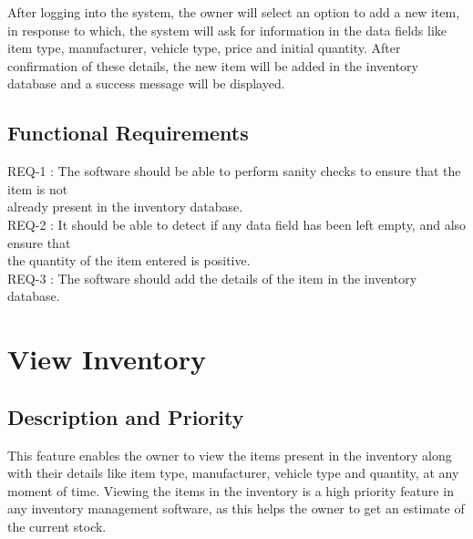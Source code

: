 \documentclass{scrreprt}
\begin{document}
After logging into the system, the owner will select an option to add a new item, in response to which, the system will ask for information in the data fields like item type, manufacturer, vehicle type, price and initial quantity. After confirmation of these details, the new item will be added in the inventory database and a success message will be displayed.

\subsection{Functional Requirements}


REQ-1 : The software should be able to perform sanity checks to ensure that the item is not\\ \hspace*{1.5cm} already present in the inventory database.\\
REQ-2 : It should be able to detect if any data field has been left empty, and also ensure that\\ \hspace*{1.5cm} the quantity of the item entered is positive.\\
REQ-3 : The software should add the details of the item in the inventory database.

\section{View Inventory}

\subsection{Description and Priority}

This feature enables the owner to view the items present in the inventory along with their details like item type, manufacturer, vehicle type and quantity, at any moment of time. Viewing the items in the inventory is a high priority feature in any inventory management software, as this helps the owner to get an estimate of the current stock.
\end{document}

